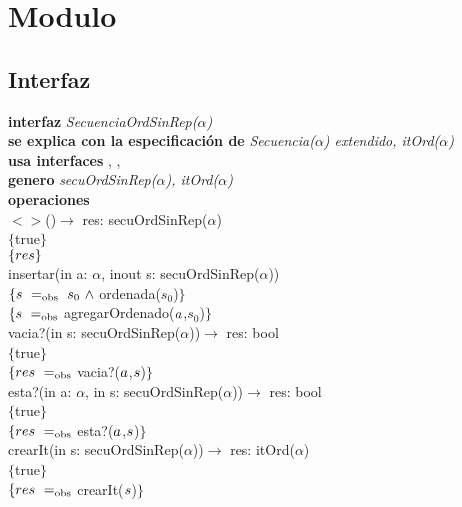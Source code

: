 \section*{Modulo }

\subsection*{Interfaz}
\textbf{interfaz} \textit{SecuenciaOrdSinRep($\alpha$)}\\
\textbf{se explica con la especificaci\'on de} \textit{Secuencia($\alpha$) extendido, itOrd($\alpha$)}\\
\textbf{usa interfaces} , \nombretad{$\alpha$}, \\
\textbf{genero} \textit{secuOrdSinRep($\alpha$), itOrd($\alpha$)}\\
\textbf{operaciones}\\

$<>$()$\longrightarrow$ res: secuOrdSinRep($\alpha$)\\
$\{$true$\}$\\
$\{{res}\}$\\

insertar(in a: $\alpha$, inout s: secuOrdSinRep($\alpha$))\\
$\{\sombreritoWide{s}\ \igobs\ s_0\ \wedge$ ordenada($s_0$)$\}$\\
$\{{s}\ =_{\mathrm{obs}}$ agregarOrdenado(${a}$,$s_0$)$\}$\\

vacia?(in s: secuOrdSinRep($\alpha$))$\longrightarrow$ res: bool\\
$\{$true$\}$\\
$\{{res}\ =_{\mathrm{obs}}$ vacia?(${a}$,${s}$)$\}$\\

esta?(in a: $\alpha$, in s: secuOrdSinRep($\alpha$))$\longrightarrow$ res: bool\\
$\{$true$\}$\\
$\{{res}\ =_{\mathrm{obs}}$ esta?(${a}$,${s}$)$\}$\\

crearIt(in s: secuOrdSinRep($\alpha$))$\longrightarrow$ res: itOrd($\alpha$)\\
$\{$true$\}$\\
$\{{res}\ =_{\mathrm{obs}}$ crearIt(${s}$)$\}$\\

